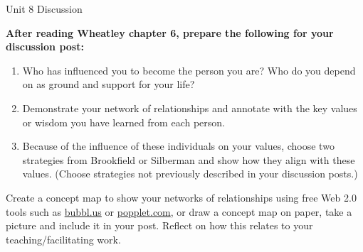\documentclass[
]{book}
\providecommand{\tightlist}{%
  \setlength{\itemsep}{0pt}\setlength{\parskip}{0pt}}
\begin{document}
\begin{assessment}
{Unit 8 Discussion}

\textbf{After reading Wheatley chapter 6, prepare the following for your discussion post:}

\begin{enumerate}
\def\labelenumi{\arabic{enumi}.}
\tightlist
\item
  Who has influenced you to become the person you are? Who do you depend on as ground and support for your life?\\
\item
  Demonstrate your network of relationships and annotate with the key values or wisdom you have learned from each person.\\
\item
  Because of the influence of these individuals on your values, choose two strategies from Brookfield or Silberman and show how they align with these values. (Choose strategies not previously described in your discussion posts.)
\end{enumerate}

Create a concept map to show your networks of relationships using free Web 2.0 tools such as \href{https://bubbl.us/}{bubbl.us} or \href{http://popplet.com/}{popplet.com}, or draw a concept map on paper, take a picture and include it in your post. Reflect on how this relates to your teaching/facilitating work.
\end{assessment}
\end{document}
